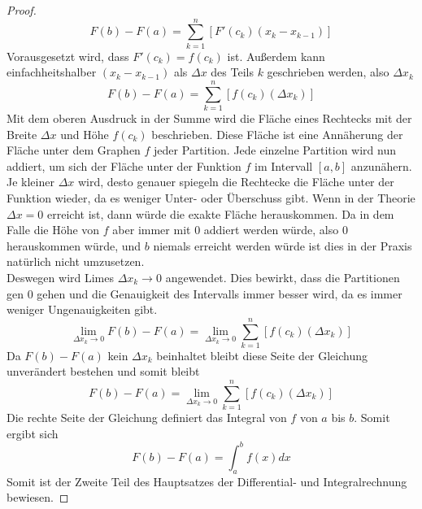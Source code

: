 \documentclass[fontsize=12pt,paper=a4,DIV12,cleardoublepage=empty, 
liststotoc,idxtotoc,bibtotoc]{article}
\theoremstyle{plain}
\theoremstyle{definition}
\begin{document}
\begin{proof}
\begin{equation*}
		F(b)-F(a)=\sum_{k=1}^{n} [F'(c_k)(x_k-x_{k-1})]
	\end{equation*}
	Vorausgesetzt wird, dass $F'(c_k)=f(c_k)$ ist. Außerdem kann einfachheitshalber $(x_k-x_{k-1})$ als $\Delta x$ des Teils $k$ geschrieben werden, also $\Delta x_k$
	\begin{equation}
		F(b)-F(a)=\sum_{k=1}^{n} [f(c_k)(\Delta x_k)]
	\end{equation}
	\newpage
Mit dem oberen Ausdruck in der Summe wird die Fläche eines Rechtecks mit der Breite $\Delta x$ und Höhe $f(c_k)$ beschrieben. Diese Fläche ist eine Annäherung der Fläche unter dem Graphen $f$ jeder Partition. Jede einzelne Partition wird nun addiert, um sich der Fläche unter der Funktion $f$ im Intervall $[a, b]$ anzunähern. Je kleiner $\Delta x$ wird, desto genauer spiegeln die Rechtecke die Fläche unter der Funktion wieder, da es weniger Unter- oder Überschuss gibt. Wenn in der Theorie $\Delta x = 0$ erreicht ist, dann  würde die exakte Fläche herauskommen. Da in dem Falle die Höhe von $f$ aber immer mit $0$ addiert werden würde, also $0$ herauskommen würde, und $b$ niemals erreicht werden würde ist dies in der Praxis natürlich nicht umzusetzen.\\
	Deswegen wird Limes $\Delta x_k \to 0$ angewendet. Dies bewirkt, dass die Partitionen gen 0 gehen und die Genauigkeit des Intervalls immer besser wird, da es immer weniger Ungenauigkeiten gibt.
	\begin{equation*}
		\lim \limits_{\Delta x_k \to 0} F(b)-F(a)=\lim \limits_{\Delta x_k \to 0} \sum_{k=1}^{n} [f(c_k)(\Delta x_k)]
	\end{equation*}
	Da $F(b)-F(a)$ kein $\Delta x_k$ beinhaltet bleibt diese Seite der Gleichung unverändert bestehen und somit bleibt
	\begin{equation*}
		F(b)-F(a)=\lim \limits_{\Delta x_k \to 0} \sum_{k=1}^{n} [f(c_k)(\Delta x_k)]
	\end{equation*}
	Die rechte Seite der Gleichung definiert das Integral von $f$ von $a$ bis $b$. Somit ergibt sich
	\begin{equation*}
		F(b)-F(a)=\int_{a}^{b}f(x)dx
	\end{equation*}
	Somit ist der Zweite Teil des Hauptsatzes der Differential- und Integralrechnung bewiesen.
	\end{proof}
	
	
	
\end{document}

